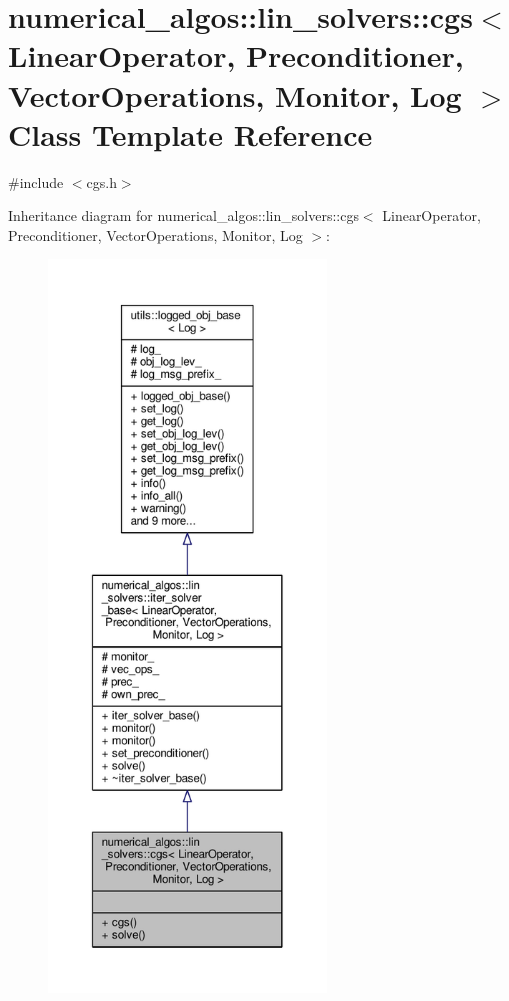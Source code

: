 \hypertarget{classnumerical__algos_1_1lin__solvers_1_1cgs}{\section{numerical\-\_\-algos\-:\-:lin\-\_\-solvers\-:\-:cgs$<$ Linear\-Operator, Preconditioner, Vector\-Operations, Monitor, Log $>$ Class Template Reference}
\label{classnumerical__algos_1_1lin__solvers_1_1cgs}
}


{\ttfamily \#include $<$cgs.\-h$>$}



Inheritance diagram for numerical\-\_\-algos\-:\-:lin\-\_\-solvers\-:\-:cgs$<$ Linear\-Operator, Preconditioner, Vector\-Operations, Monitor, Log $>$\-:
\nopagebreak
\begin{figure}[H]
\begin{center}
\leavevmode
\includegraphics[height=550pt]{classnumerical__algos_1_1lin__solvers_1_1cgs__inherit__graph}
\end{center}
\end{figure}



